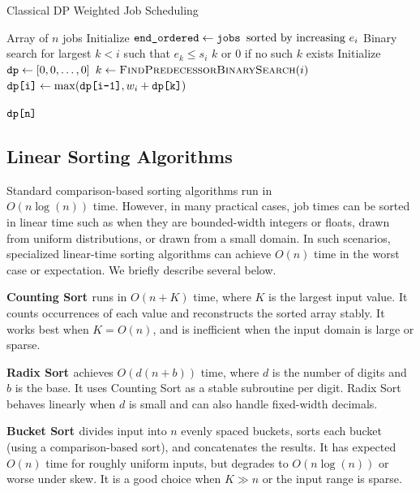 \documentclass[final,5p,times]{elsarticle}
\makeatletter
\newcommand{\code}[1]{\texttt{\detokenize{#1}}}
\newcommand{\breaktwo}{\if@twocolumn\\\fi}
\makeatother
\begin{document}
\begin{algorithm}[H]
\caption{Classical DP Weighted Job Scheduling}
\begin{algorithmic}[1]
\Require Array \code{jobs} of $n$ jobs
\State Initialize $\code{end_ordered} \gets \code{jobs } \text{sorted by increasing } e_i$
    \State Binary search for largest $k < i$ such that $e_k \leq s_i$
    \State \Return $k$ or $0$ if no such $k$ exists
\EndFunction
\State Initialize $\code{dp} \gets [0, 0, \ldots, 0]$
    \State $k \gets \textsc{FindPredecessorBinarySearch}(i)$
    \State $\code{dp[i]} \gets \max(\code{dp[i-1]}, w_i + \code{dp[k]})$
\EndFor

\State \Return $\code{dp[n]}$
\end{algorithmic}
\end{algorithm}


\subsection{Linear Sorting Algorithms}
\label{sec:sorting}
Standard comparison-based sorting algorithms run in \breaktwo$O(n \log(n))$ time. However, in many practical cases, job times can be sorted in linear time such as when they are bounded-width integers or floats, drawn from uniform distributions, or drawn from a small domain. In such scenarios, specialized linear-time sorting algorithms can achieve $O(n)$ time in the worst case or expectation. We briefly describe several below.

\textbf{Counting Sort \cite{cormen2009}} runs in $O(n + K)$ time, where $K$ is the largest input value. It counts occurrences of each value and reconstructs the sorted array stably. It works best when $K = O(n)$, and is inefficient when the input domain is large or sparse.

\textbf{Radix Sort \cite{cormen2009}} achieves $O(d(n + b))$ time, where $d$ is the number of digits and $b$ is the base. It uses Counting Sort as a stable subroutine per digit. Radix Sort behaves linearly when $d$ is small and can also handle fixed-width decimals.

\textbf{Bucket Sort \cite{aho1983}} divides input into $n$ evenly spaced buckets, sorts each bucket (using a comparison-based sort), and concatenates the results. It has expected $O(n)$ time for roughly uniform inputs, but degrades to $O(n \log(n))$ or worse under skew. It is a good choice when $K \gg n$ or the input range is sparse.
\end{document}
